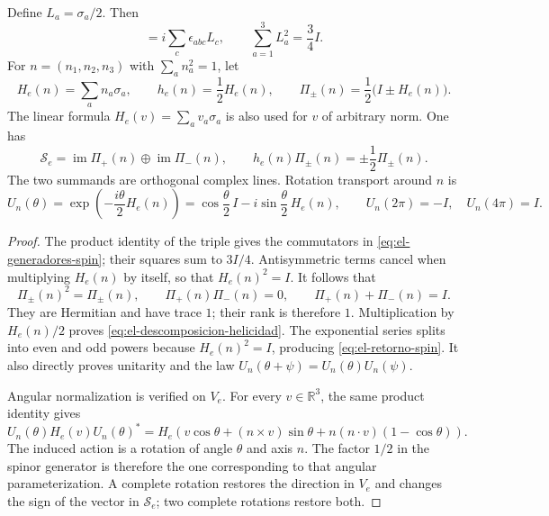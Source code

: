 \begin{proposition}
\label{prop:el-helicidad}
Define \(L_a=\sigma_a/2\). Then
\begin{equation}
 [L_a,L_b]=i\sum_c\epsilon_{abc}L_c,
 \qquad \sum_{a=1}^3L_a^2=\frac34 I.
 \label{eq:el-generadores-spin}
\end{equation}
For \(n=(n_1,n_2,n_3)\) with \(\sum_an_a^2=1\), let
\[
 H_e(n)=\sum_an_a\sigma_a,\qquad
 h_e(n)=\frac12H_e(n),\qquad
 \Pi_\pm(n)=\frac12\bigl(I\pm H_e(n)\bigr).
\]
The linear formula \(H_e(v)=\sum_av_a\sigma_a\) is also used
for \(v\) of arbitrary norm.
One has
\begin{equation}
 \mathscr S_e=\operatorname{im}\Pi_+(n)
             \mathbin{\oplus}\operatorname{im}\Pi_-(n),
 \qquad
 h_e(n)\Pi_\pm(n)=\pm\frac12\Pi_\pm(n).
 \label{eq:el-descomposicion-helicidad}
\end{equation}
The two summands are orthogonal complex lines. Rotation
transport around \(n\) is
\begin{equation}
 U_n(\theta)=\exp\!\left(-\frac{i\theta}{2}H_e(n)\right)
 =\cos\frac\theta2\,I-i\sin\frac\theta2\,H_e(n),
 \qquad
 U_n(2\pi)=-I,\quad U_n(4\pi)=I.
 \label{eq:el-retorno-spin}
\end{equation}
\end{proposition}
\begin{proof}
The product identity of the triple gives the commutators in
\eqref{eq:el-generadores-spin}; their squares sum to \(3I/4\).
Antisymmetric terms cancel when multiplying
\(H_e(n)\) by itself, so that \(H_e(n)^2=I\).
It follows that
\[
 \Pi_\pm(n)^2=\Pi_\pm(n),\qquad
 \Pi_+(n)\Pi_-(n)=0,\qquad \Pi_+(n)+\Pi_-(n)=I.
\]
They are Hermitian and have trace \(1\); their rank is therefore \(1\).
Multiplication by \(H_e(n)/2\) proves
\eqref{eq:el-descomposicion-helicidad}. The exponential series
splits into even and odd powers because \(H_e(n)^2=I\), producing
\eqref{eq:el-retorno-spin}. It also directly proves
unitarity and the law \(U_n(\theta+\psi)=U_n(\theta)U_n(\psi)\).

Angular normalization is verified on \(V_e\). For every
\(v\in\mathbb R^3\), the same product identity gives
\[
 U_n(\theta)H_e(v)U_n(\theta)^*
 =H_e\!\left(v\cos\theta+(n\mathbin{\times}v)\sin\theta
       +n(n\mathbin{\cdot}v)(1-\cos\theta)\right).
\]
The induced action is a rotation of angle \(\theta\) and axis \(n\).
The factor \(1/2\) in the spinor generator is therefore the one
corresponding to that angular parameterization. A complete rotation restores
the direction in \(V_e\) and changes the sign of the vector in
\(\mathscr S_e\); two complete rotations restore both.
\end{proof}


